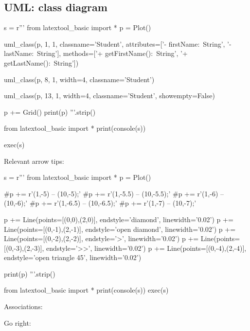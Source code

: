 \subsection{UML: class diagram}

\begin{python}
s = r'''
from latextool_basic import *
p = Plot()
    
uml_class(p, 1, 1,
             classname='Student',
             attributes=['- firstName:\ String',
                         '- lastName:\ String'],
             methods=['+ getFirstName():\ String',
                      '+ getLastName():\ String'])

uml_class(p, 8, 1,
             width=4,
             classname='Student')

uml_class(p, 13, 1,
             width=4,
             classname='Student',
             showempty=False)

p += Grid()
print(p)
'''.strip()

from latextool_basic import *
print(console(s))

exec(s)
\end{python}


\newpage
Relevant arrow tips:
\begin{python}
s = r'''
from latextool_basic import *
p = Plot()
    
#p += r'\draw[->>] (1,-5) -- (10,-5);'
#p += r'\draw[->] (1,-5.5) -- (10,-5.5);'
#p += r'\draw[-diamond] (1,-6) -- (10,-6);'
#p += r' (1,-6.5) -- (10,-6.5);'
#p += r' (1,-7) -- (10,-7);'


p += Line(points=[(0,0),(2,0)], endstyle='diamond', linewidth='0.02')
p += Line(points=[(0,-1),(2,-1)], endstyle='open diamond', linewidth='0.02')
p += Line(points=[(0,-2),(2,-2)], endstyle='>', linewidth='0.02')
p += Line(points=[(0,-3),(2,-3)], endstyle='>>', linewidth='0.02')
p += Line(points=[(0,-4),(2,-4)], endstyle='open triangle 45', linewidth='0.02')

print(p)
'''.strip()

from latextool_basic import *
print(console(s))
exec(s)
\end{python}


\newpage
Associations:

Go right:

